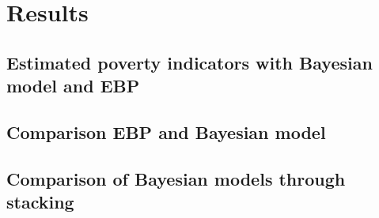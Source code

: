 \chapter{Results}

\section{Estimated poverty indicators with Bayesian model and EBP}

\section{Comparison EBP and Bayesian model}

\section{Comparison of Bayesian models through stacking}


